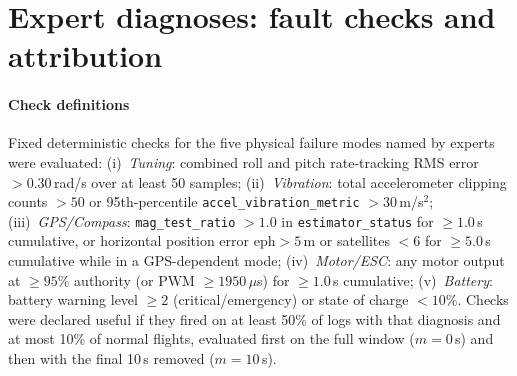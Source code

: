 \documentclass[preprint,12pt]{elsarticle}
\begin{document}
\FloatBarrier

\section{Expert diagnoses: fault checks and attribution}
\label{sup:experts}
\paragraph{Check definitions} Fixed deterministic checks for
the five physical failure modes named by experts were evaluated:
(i)~\textit{Tuning}: combined roll and pitch rate-tracking RMS error $> 0.30$\,rad/s over at least 50 samples;
(ii)~\textit{Vibration}: total accelerometer clipping counts $> 50$ or 95th-percentile \texttt{accel\_vibration\_metric} $> 30$\,m/s$^2$;
(iii)~\textit{GPS/Compass}: \texttt{mag\_test\_ratio} $> 1.0$ in \texttt{estimator\_status} for $\ge 1.0$\,s cumulative, or horizontal position error $\text{eph} > 5$\,m or satellites $< 6$ for $\ge 5.0$\,s cumulative while in a GPS-dependent mode;
(iv)~\textit{Motor/ESC}: any motor output at $\ge 95\%$ authority (or PWM $\ge 1950$\,$\mu$s) for $\ge 1.0$\,s cumulative;
(v)~\textit{Battery}: battery warning level $\ge 2$ (critical/emergency) or state of charge $< 10\%$.
Checks were declared useful if they fired on at least 50\% of logs with that diagnosis and at most 10\% of normal flights,
evaluated first on the full window ($m=0$\,s) and then with the final 10\,s removed ($m=10$\,s).
\end{document}
